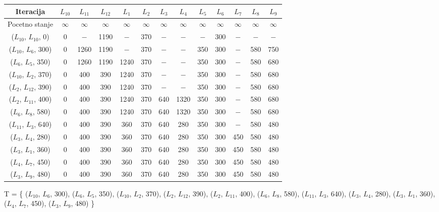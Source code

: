 \documentclass[12pt]{article}
\begin{document}
\begin{tabular}{ | c || c  | c | c | c | c | c | c | c | c | c | c | c | }
\hline
Iteracija & \(L_{10}\) & \(L_{11}\) & \(L_{12}\) & \(L_{1}\) & \(L_{2}\) & \(L_{3}\) & \(L_{4}\) & \(L_{5}\) & \(L_{6}\) & \(L_{7}\) & \(L_{8}\) & \(L_{9}\)\\
 \hline
 \hline
Pocetno stanje & $\infty$ & $\infty$ & $\infty$ & $\infty$ & $\infty$ & $\infty$ & $\infty$ & $\infty$ & $\infty$ & $\infty$ & $\infty$ & $\infty$\\
 \hline
(\(L_{10}\), \(L_{10}\), 0) & 0 & $-$ & 1190 & $-$ & 370 & $-$ & $-$ & $-$ & 300 & $-$ & $-$ & $-$\\
 \hline
(\(L_{10}\), \(L_{6}\), 300) & 0 & 1260 & 1190 & $-$ & 370 & $-$ & $-$ & 350 & 300 & $-$ & 580 & 750\\
 \hline
(\(L_{6}\), \(L_{5}\), 350) & 0 & 1260 & 1190 & 1240 & 370 & $-$ & $-$ & 350 & 300 & $-$ & 580 & 680\\
 \hline
(\(L_{10}\), \(L_{2}\), 370) & 0 & 400 & 390 & 1240 & 370 & $-$ & $-$ & 350 & 300 & $-$ & 580 & 680\\
 \hline
(\(L_{2}\), \(L_{12}\), 390) & 0 & 400 & 390 & 1240 & 370 & $-$ & $-$ & 350 & 300 & $-$ & 580 & 680\\
 \hline
(\(L_{2}\), \(L_{11}\), 400) & 0 & 400 & 390 & 1240 & 370 & 640 & 1320 & 350 & 300 & $-$ & 580 & 680\\
 \hline
(\(L_{6}\), \(L_{8}\), 580) & 0 & 400 & 390 & 1240 & 370 & 640 & 1320 & 350 & 300 & $-$ & 580 & 680\\
 \hline
(\(L_{11}\), \(L_{3}\), 640) & 0 & 400 & 390 & 360 & 370 & 640 & 280 & 350 & 300 & $-$ & 580 & 480\\
 \hline
(\(L_{3}\), \(L_{4}\), 280) & 0 & 400 & 390 & 360 & 370 & 640 & 280 & 350 & 300 & 450 & 580 & 480\\
 \hline
(\(L_{3}\), \(L_{1}\), 360) & 0 & 400 & 390 & 360 & 370 & 640 & 280 & 350 & 300 & 450 & 580 & 480\\
 \hline
(\(L_{4}\), \(L_{7}\), 450) & 0 & 400 & 390 & 360 & 370 & 640 & 280 & 350 & 300 & 450 & 580 & 480\\
 \hline
(\(L_{3}\), \(L_{9}\), 480) & 0 & 400 & 390 & 360 & 370 & 640 & 280 & 350 & 300 & 450 & 580 & 480\\
 \hline
\end{tabular}


T =  \{ (\(L_{10}\), \(L_{6}\), 300), (\(L_{6}\), \(L_{5}\), 350), (\(L_{10}\), \(L_{2}\), 370), (\(L_{2}\), \(L_{12}\), 390), (\(L_{2}\), \(L_{11}\), 400), (\(L_{6}\), \(L_{8}\), 580), (\(L_{11}\), \(L_{3}\), 640), (\(L_{3}\), \(L_{4}\), 280), (\(L_{3}\), \(L_{1}\), 360), (\(L_{4}\), \(L_{7}\), 450), (\(L_{3}\), \(L_{9}\), 480) \}
\end{document}
